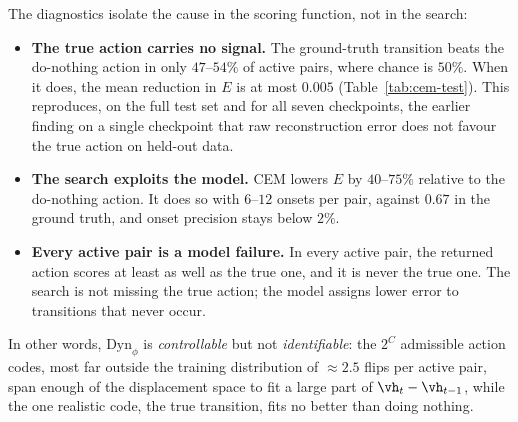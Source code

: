 The diagnostics isolate the cause in the scoring function, not in the search:
\begin{itemize}
\item \textbf{The true action carries no signal.} The ground-truth transition beats the do-nothing action in only $47$--$54\%$ of active pairs, where chance is $50\%$. When it does, the mean reduction in $E$ is at most $0.005$ (Table~\ref{tab:cem-test}). This reproduces, on the full test set and for all seven checkpoints, the earlier finding on a single checkpoint that raw reconstruction error does not favour the true action on held-out data.
\item \textbf{The search exploits the model.} CEM lowers $E$ by $40$--$75\%$ relative to the do-nothing action. It does so with $6$--$12$ onsets per pair, against $0.67$ in the ground truth, and onset precision stays below $2\%$.
\item \textbf{Every active pair is a model failure.} In every active pair, the returned action scores at least as well as the true one, and it is never the true one. The search is not missing the true action; the model assigns lower error to transitions that never occur.
\end{itemize}
In other words, $\text{Dyn}_\phi$ is \emph{controllable} but not \emph{identifiable}: the $2^C$ admissible action codes, most far outside the training distribution of $\approx 2.5$ flips per active pair, span enough of the displacement space to fit a large part of $\vh_t-\vh_{t-1}$, while the one realistic code, the true transition, fits no better than doing nothing.

